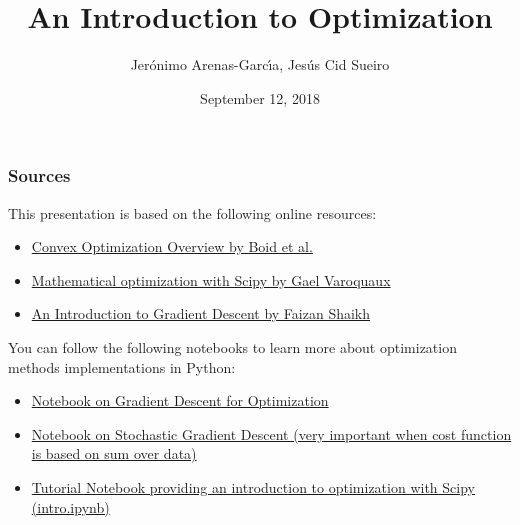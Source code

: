 \documentclass{beamer}
\title[Optimization]{An Introduction to Optimization} %
\author{Jer\'onimo Arenas-Garc\'{\i}a, Jes\'us Cid Sueiro} %
\institute[UC3M] %
{
Universidad Carlos III de Madrid \\ %
\medskip
\textit{jeronimo.arenas@uc3m.es} %
}
\date{September 12, 2018}
\begin{document}
\begin{frame}
\titlepage %
\end{frame}

\begin{frame}

    \frametitle{Sources}

This presentation is based on the following online resources:

\small



    \begin{itemize}
  
    	\item \href{http://web.stanford.edu/~boyd/papers/pdf/cvx_opt_intro.pdf}{Convex Optimization Overview by Boid et al.}
    	\item \href{https://www.scipy-lectures.org/advanced/mathematical_optimization/}{Mathematical optimization with Scipy by Gael Varoquaux}
    	\item \href{https://www.analyticsvidhya.com/blog/2017/03/introduction-to-gradient-descent-algorithm-along-its-variants/}{An Introduction to Gradient Descent by Faizan Shaikh}
    
    \end{itemize}
    
You can follow the following notebooks to learn more about optimization methods implementations in Python:

\begin{itemize}

\item \href{https://github.com/hammadshaikhha/Math-of-Machine-Learning-Course-by-Siraj/tree/master/Gradient\%20Descent\%20for\%20Optimization}{Notebook on Gradient Descent for Optimization}
\item \href{https://github.com/dtnewman/gradient_descent}{Notebook on Stochastic Gradient Descent (very important when cost function is based on sum over data)}
\item\href{https://github.com/mmckerns/tutmom}{Tutorial Notebook providing an introduction to optimization with Scipy (intro.ipynb)}

\end{itemize}
    

\end{frame}
\end{document}
